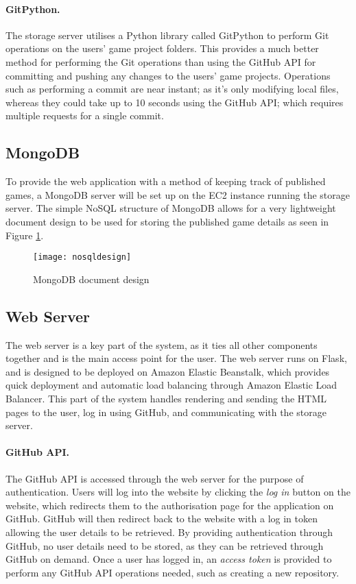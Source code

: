 	\paragraph{GitPython.}
	The storage server utilises a Python library called GitPython to perform Git operations on the users' game project folders. This provides a much better method for performing the Git operations than using the GitHub API for committing and pushing any changes to the users' game projects. Operations such as performing a commit are near instant; as it's only modifying local files, whereas they could take up to 10 seconds using the GitHub API; which requires multiple requests for a single commit.

	\subsection{MongoDB}
	To provide the web application with a method of keeping track of published games, a MongoDB server will be set up on the EC2 instance running the storage server.\cite{mongodb} The simple NoSQL structure of MongoDB allows for a very lightweight document design to be used for storing the published game details as seen in Figure \ref{fig:nosqldesign}.

	\begin{figure}[h]
		\centering
		\texttt{[image: nosqldesign]}
		\caption{MongoDB document design}
		\label{fig:nosqldesign}
	\end{figure}

	\subsection{Web Server}
	The web server is a key part of the system, as it ties all other components together and is the main access point for the user. The web server runs on Flask, and is designed to be deployed on Amazon Elastic Beanstalk, which provides quick deployment and automatic load balancing through Amazon Elastic Load Balancer. This part of the system handles rendering and sending the HTML pages to the user, log in using GitHub, and communicating with the storage server.

	\paragraph{GitHub API.}
	The GitHub API is accessed through the web server for the purpose of authentication. Users will log into the website by clicking the \emph{log in} button on the website, which redirects them to the authorisation page for the application on GitHub. GitHub will then redirect back to the website with a log in token allowing the user details to be retrieved. By providing authentication through GitHub, no user details need to be stored, as they can be retrieved through GitHub on demand. Once a user has logged in, an \emph{access token} is provided to perform any GitHub API operations needed, such as creating a new repository.


